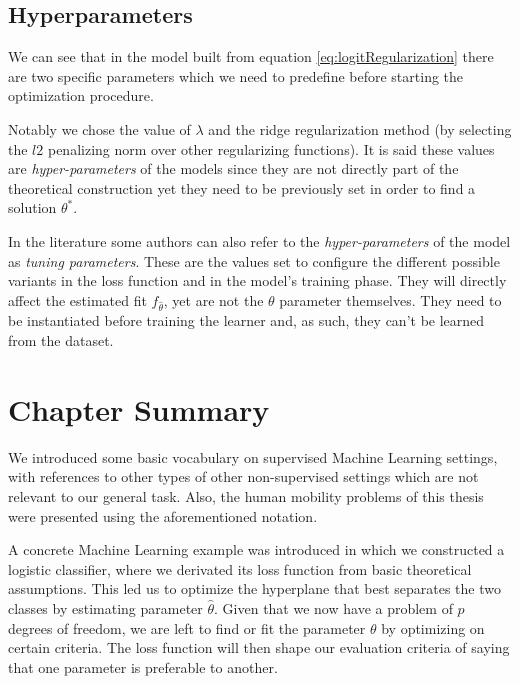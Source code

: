 \subsection{Hyperparameters}

We can see that in the model built from equation \cref{eq:logitRegularization} there are two specific parameters which we need to predefine before starting the optimization procedure.

Notably we chose the value of $\lambda$ and the ridge regularization method (by selecting the $l2$ penalizing norm over other regularizing functions). %
It is said these values are \textit{hyper-parameters} of the models since they are not directly part of the theoretical construction yet they need to be previously set in order to find a solution $\theta^\ast$.

In the literature some authors can also refer to the \textit{hyper-parameters} of the model as \textit{tuning parameters}.
These are the values set to configure the different possible variants in the loss function and in the model's training phase.
They will directly affect the estimated fit $f_{\hat{\theta}}$, yet are not the $\theta$ parameter themselves.
They need to be instantiated before training the learner and, as such, they can't be learned from the dataset.




\section{Chapter Summary}\label{section-ch_machine_learning_summary}

We introduced some basic vocabulary on supervised Machine Learning settings, with references to other types of other non-supervised settings which are not relevant to our general task.
Also, the human mobility problems of this thesis were presented using the aforementioned notation.

A concrete Machine Learning example was introduced in which we constructed a logistic classifier, where we derivated its loss function from basic theoretical assumptions.
This led us to optimize the hyperplane that best separates the two classes by estimating parameter $\hat{\theta}$.
Given that we now have a problem of $p$ degrees of freedom, we are left to find or fit the parameter $\theta$ by optimizing on certain criteria.
The loss function will then shape our evaluation criteria of saying that one parameter is preferable to another.

